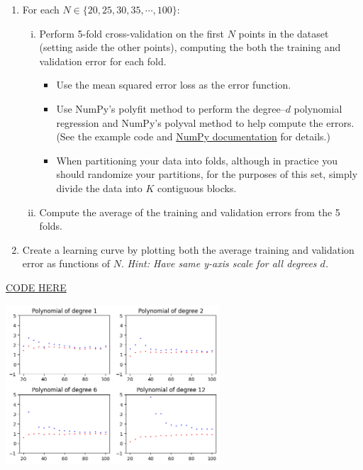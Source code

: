 \begin{problem}[14]
  \begin{enumerate}
    \item For each $N \in \{20, 25, 30, 35, \cdots, 100\}$:
    \begin{enumerate}[i.]
      \item Perform 5-fold cross-validation on the first $N$ points in the dataset (setting aside the other points), computing the both the training and validation error for each fold. 
      \begin{itemize}
        \item Use the mean squared error loss as the error function.
        \item Use NumPy's polyfit method to perform the degree--$d$ polynomial regression and NumPy's polyval method to help compute the errors.  (See the example code and \href{https://docs.scipy.org/doc/NumPy/reference/routines.polynomials.poly1d.html}{NumPy documentation} for details.)
        \item When partitioning your data into folds, although in practice you should randomize your partitions, for the purposes of this set, simply divide the data into $K$ contiguous blocks.
      \end{itemize}
      \item Compute the average of the training and validation errors from the 5 folds.
    \end{enumerate}
    \item Create a learning curve by plotting both the average training and validation error as functions of $N$. \textit{Hint: Have same y-axis scale for all degrees $d$.}
  \end{enumerate}

\end{problem}
\begin{solution}
\href{https://colab.research.google.com/drive/1vB_mlWWWBEmudPGr49NszSYmXRUAdfZg?usp=sharing}{CODE HERE} \\
\begin{center}
    \includegraphics[width=8cm]{set1/images/output.png}
\end{center}
  \end{solution}

